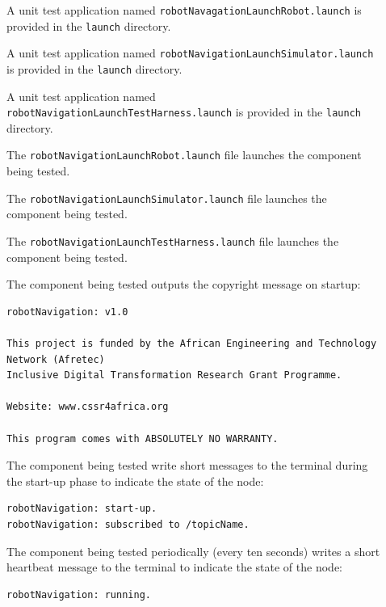 \documentclass{CSSRforAfrica}
\newcommand{\checkboxChecked}{\fbox{\ding{51}}} %
\newcommand{\checkboxDashed}{\fbox{--}}         %
\begin{document}
\begin{description}

\item[\checkboxDashed] A unit test application named {\small \verb+robotNavagationLaunchRobot.launch+} is provided in the {\small \verb+launch+} directory. 

\item[\checkboxDashed] A unit test application named {\small \verb+robotNavigationLaunchSimulator.launch+} is provided in the {\small \verb+launch+} directory.

\item[\checkboxDashed] A unit test application named {\small \verb+robotNavigationLaunchTestHarness.launch+} is provided in the {\small \verb+launch+} directory.

\item[\checkboxDashed] The {\small \verb+robotNavigationLaunchRobot.launch+} file  launches the component being tested.

\item[\checkboxDashed] The {\small \verb+robotNavigationLaunchSimulator.launch+} file  launches the component being tested.

\item[\checkboxDashed] The {\small \verb+robotNavigationLaunchTestHarness.launch+} file  launches the component being tested.

\item[\checkboxChecked] The component being tested outputs the copyright message on startup:  \\ 
{\scriptsize
\begin{verbatim}
robotNavigation: v1.0

This project is funded by the African Engineering and Technology Network (Afretec) 
Inclusive Digital Transformation Research Grant Programme. 

Website: www.cssr4africa.org

This program comes with ABSOLUTELY NO WARRANTY.
\end{verbatim}
}

\item[\checkboxChecked] The component being tested write short messages to the terminal  during the start-up phase to indicate the state of the node:
{\small
\begin{verbatim}
robotNavigation: start-up.
robotNavigation: subscribed to /topicName.
\end{verbatim}
} 

\item[\checkboxChecked] The component being tested periodically (every ten seconds) writes a short heartbeat message to the terminal to indicate the state of the node:
{\small
\begin{verbatim}
robotNavigation: running.
\end{verbatim}
}


\end{description}
\end{document}
